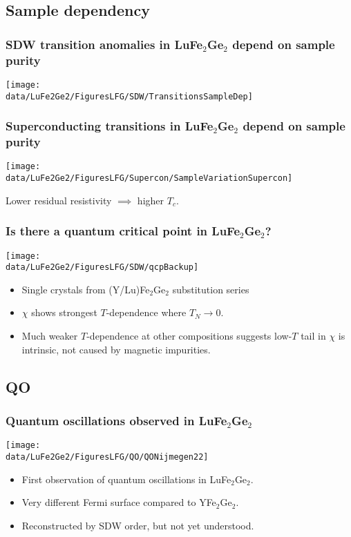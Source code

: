 \subsection{Sample dependency}
\begin{frame}[plain,label=LFGAnomalies]
\frametitle{SDW transition anomalies in LuFe$_2$Ge$_2$ depend on sample purity}
\texttt{[image: \\data/LuFe2Ge2/FiguresLFG/SDW/TransitionsSampleDep]}
\end{frame}

\begin{frame}[plain,label=LFGSuperconSamples]
\frametitle{Superconducting transitions in LuFe$_2$Ge$_2$ depend on sample purity}
\texttt{[image: \\data/LuFe2Ge2/FiguresLFG/Supercon/SampleVariationSupercon]}
\centerline{Lower residual resistivity $\implies$ higher $T_c$.}
\end{frame}


\begin{frame}[label=QCP]
\frametitle{Is there a quantum critical point in LuFe$_2$Ge$_2$?}
\centerline{\texttt{[image: \\data/LuFe2Ge2/FiguresLFG/SDW/qcpBackup]}}

\begin{itemize}
\item
Single crystals from (Y/Lu)Fe$_2$Ge$_2$ substitution series
\item
$\chi$ shows strongest $T$-dependence where $T_N \rightarrow 0$.
\item
Much weaker $T$-dependence at other compositions suggests low-$T$ tail in $\chi$ is intrinsic, not caused by magnetic impurities.
\end{itemize}
\end{frame}



\subsection{QO}
\begin{frame}[label=LFGAnomalies]
\frametitle{Quantum oscillations observed in LuFe$_2$Ge$_2$}
\centerline{\texttt{[image: \\data/LuFe2Ge2/FiguresLFG/QO/QONijmegen22]}}

\begin{itemize}
\item First observation of quantum oscillations in LuFe$_2$Ge$_2$.
\item Very different Fermi surface compared to YFe$_2$Ge$_2$.
\item Reconstructed by SDW order, but not yet understood.

\end{itemize}
\end{frame}

